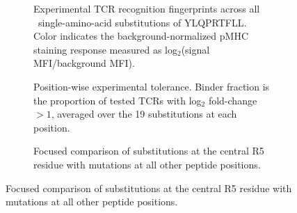 \documentclass{article}
\begin{document}
\begin{figure}[!t]
\centering


\begin{subfigure}[t]{0.97\textwidth}
\centering

%

\caption{
Experimental TCR recognition fingerprints across all \valNmutations\
single-amino-acid substitutions of YLQPRTFLL. Color indicates the
background-normalized pMHC staining response measured as
log$_2$(signal MFI/background MFI).
}
\label{fig:experimental_fingerprint}
\end{subfigure}

\vspace{0.35cm}


\begin{subfigure}[t]{0.58\textwidth}
\centering

%

\caption{
Position-wise experimental tolerance. Binder fraction is the
proportion of tested TCRs with log$_2$ fold-change $>1$, averaged
over the 19 substitutions at each position.
}
\label{fig:experimental_position}
\end{subfigure}%
\hfill%
\begin{subfigure}[t]{0.36\textwidth}
\centering

%

\caption{
Focused comparison of substitutions at the central R5 residue
with mutations at all other peptide positions.
}
\label{fig:experimental_r5}
\end{subfigure}


\end{figure}
\end{document}
